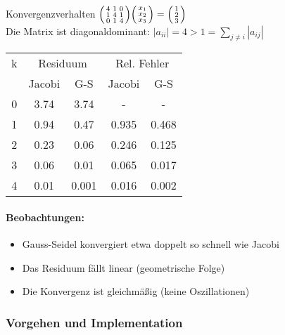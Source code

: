 \begin{example2}{Konvergenzverhalten}
$\begin{psmallmatrix}
4 & 1 & 0\\
1 & 4 & 1\\
0 & 1 & 4
\end{psmallmatrix}
\begin{psmallmatrix}
x_1\\
x_2\\
x_3
\end{psmallmatrix} =
\begin{psmallmatrix}
1\\
2\\
3
\end{psmallmatrix}$
\vspace{1mm}\\
\small
Die Matrix ist diagonaldominant:
$|a_{ii}| = 4 > 1 = \sum_{j\neq i} |a_{ij}|$
\vspace{1mm}\\
\begin{tabular}{c|cc|cc}
k & \multicolumn{2}{c|}{Residuum} & \multicolumn{2}{c}{Rel. Fehler}\\
& Jacobi & G-S & Jacobi & G-S\\
\hline
0 & 3.74 & 3.74 & - & -\\
1 & 0.94 & 0.47 & 0.935 & 0.468\\
2 & 0.23 & 0.06 & 0.246 & 0.125\\
3 & 0.06 & 0.01 & 0.065 & 0.017\\
4 & 0.01 & 0.001 & 0.016 & 0.002
\end{tabular}

\paragraph{Beobachtungen:}
\begin{itemize}
    \item Gauss-Seidel konvergiert etwa doppelt so schnell wie Jacobi
    \item Das Residuum fällt linear (geometrische Folge)
    \item Die Konvergenz ist gleichmäßig (keine Oszillationen)
\end{itemize}
\end{example2}

\subsubsection{Vorgehen und Implementation}

